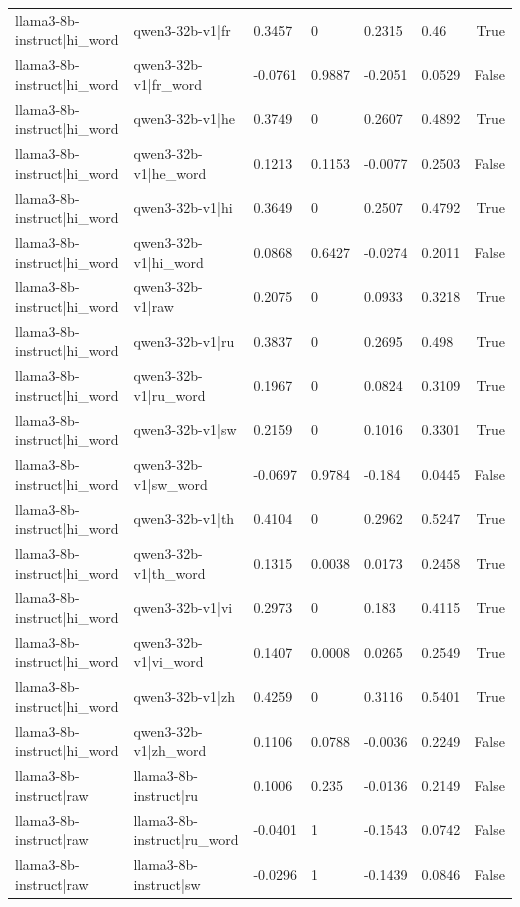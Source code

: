 \begin{table}
\begin{tabular}{llllllr}
llama3-8b-instruct|hi_word & qwen3-32b-v1|fr & 0.3457 & 0 & 0.2315 & 0.46 & True \\
llama3-8b-instruct|hi_word & qwen3-32b-v1|fr_word & -0.0761 & 0.9887 & -0.2051 & 0.0529 & False \\
llama3-8b-instruct|hi_word & qwen3-32b-v1|he & 0.3749 & 0 & 0.2607 & 0.4892 & True \\
llama3-8b-instruct|hi_word & qwen3-32b-v1|he_word & 0.1213 & 0.1153 & -0.0077 & 0.2503 & False \\
llama3-8b-instruct|hi_word & qwen3-32b-v1|hi & 0.3649 & 0 & 0.2507 & 0.4792 & True \\
llama3-8b-instruct|hi_word & qwen3-32b-v1|hi_word & 0.0868 & 0.6427 & -0.0274 & 0.2011 & False \\
llama3-8b-instruct|hi_word & qwen3-32b-v1|raw & 0.2075 & 0 & 0.0933 & 0.3218 & True \\
llama3-8b-instruct|hi_word & qwen3-32b-v1|ru & 0.3837 & 0 & 0.2695 & 0.498 & True \\
llama3-8b-instruct|hi_word & qwen3-32b-v1|ru_word & 0.1967 & 0 & 0.0824 & 0.3109 & True \\
llama3-8b-instruct|hi_word & qwen3-32b-v1|sw & 0.2159 & 0 & 0.1016 & 0.3301 & True \\
llama3-8b-instruct|hi_word & qwen3-32b-v1|sw_word & -0.0697 & 0.9784 & -0.184 & 0.0445 & False \\
llama3-8b-instruct|hi_word & qwen3-32b-v1|th & 0.4104 & 0 & 0.2962 & 0.5247 & True \\
llama3-8b-instruct|hi_word & qwen3-32b-v1|th_word & 0.1315 & 0.0038 & 0.0173 & 0.2458 & True \\
llama3-8b-instruct|hi_word & qwen3-32b-v1|vi & 0.2973 & 0 & 0.183 & 0.4115 & True \\
llama3-8b-instruct|hi_word & qwen3-32b-v1|vi_word & 0.1407 & 0.0008 & 0.0265 & 0.2549 & True \\
llama3-8b-instruct|hi_word & qwen3-32b-v1|zh & 0.4259 & 0 & 0.3116 & 0.5401 & True \\
llama3-8b-instruct|hi_word & qwen3-32b-v1|zh_word & 0.1106 & 0.0788 & -0.0036 & 0.2249 & False \\
llama3-8b-instruct|raw & llama3-8b-instruct|ru & 0.1006 & 0.235 & -0.0136 & 0.2149 & False \\
llama3-8b-instruct|raw & llama3-8b-instruct|ru_word & -0.0401 & 1 & -0.1543 & 0.0742 & False \\
llama3-8b-instruct|raw & llama3-8b-instruct|sw & -0.0296 & 1 & -0.1439 & 0.0846 & False \\

\end{tabular}
\end{table}
